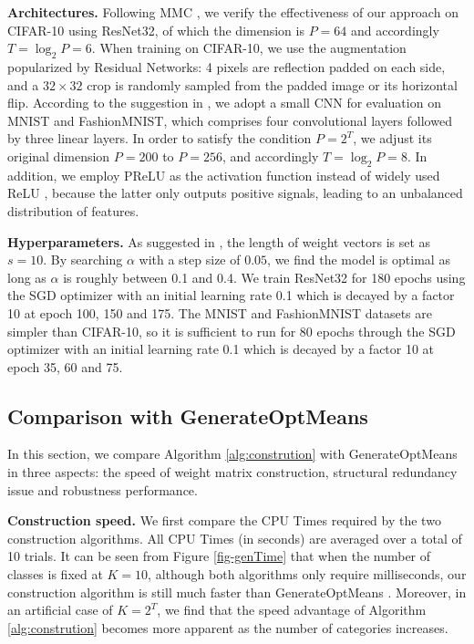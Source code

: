 \documentclass[preprint,review,12pt]{elsarticle}
\numberwithin{equation}{section}
\begin{document}
\textbf{Architectures.}
Following MMC \cite{pang2020},
we verify the effectiveness of our approach on CIFAR-10 using ResNet32,
of which the dimension is $P=64$ and accordingly $T=\log_2 P = 6$.
When training on CIFAR-10, we use the augmentation popularized by Residual Networks:
4 pixels are reflection padded on each side, and a $32 \times 32$ crop is randomly sampled from the padded image or its horizontal flip.
According to the suggestion in \cite{carlini2017,zhang2019b},
we adopt a small CNN for evaluation on MNIST and FashionMNIST,
which comprises four convolutional layers followed by three linear layers.
In order to satisfy the condition $P=2^T$, we adjust its original dimension $P=200$ to $P=256$,
and accordingly $T=\log_2 P = 8$.
In addition, we employ PReLU\cite{he2015} as the activation function instead of widely used ReLU \cite{nair2010},
because the latter only outputs positive signals, leading to an unbalanced distribution of features.


\textbf{Hyperparameters.}
As suggested in \cite{pang2018}, the length of weight vectors is set as $s=10$.
By searching $\alpha$ with a step size of $0.05$,
we find the model is optimal as long as $\alpha$ is roughly between 0.1 and 0.4.
We train ResNet32 for 180 epochs
using the SGD optimizer with an initial learning rate 0.1 which is decayed by a factor 10 at epoch 100, 150 and 175.
The MNIST and FashionMNIST datasets are simpler than CIFAR-10,
so it is sufficient to run for 80 epochs through the SGD optimizer
with an initial learning rate 0.1 which is decayed by a factor 10 at epoch 35, 60 and 75.








\subsection{Comparison with GenerateOptMeans}
\label{experiment:redundancy}
In this section, we compare Algorithm \ref{alg:constrution} with GenerateOptMeans  \cite{pang2020} in three aspects:
the speed of weight matrix construction,  structural redundancy issue and robustness performance.

\textbf{Construction speed.} We first compare the CPU Times required by the two construction algorithms.
All CPU Times (in seconds) are averaged over a total of 10 trials.
It can be seen from Figure \ref{fig-genTime} that when the number of classes is fixed at $K=10$,
although both algorithms only require milliseconds, our construction algorithm is still much faster than GenerateOptMeans \cite{pang2020}.
Moreover, in an artificial case of $ K=2^T $,
we find that the speed advantage of Algorithm \ref{alg:constrution} becomes more apparent as the number of categories increases.
\end{document}
